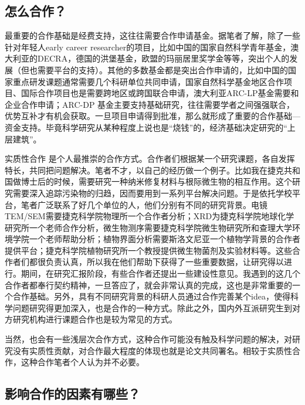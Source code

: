 \documentclass[]{book}
\begin{document}
\hypertarget{ux600eux4e48ux5408ux4f5c}{%
\subsection{怎么合作？}\label{ux600eux4e48ux5408ux4f5c}}

最重要的合作基础是经费支持，这往往需要合作申请基金。据笔者了解，除了一些针对年轻人early career researcher的项目，比如中国的国家自然科学青年基金，澳大利亚的DECRA，德国的洪堡基金，欧盟的玛丽居里奖学金等等，突出个人的发展（但也需要平台的支持）。其他的多数基金都是突出合作申请的，比如中国的国家重点研发课题通常需要几个科研单位共同申请，国家自然科学基金地区合作项目、国际合作项目也是需要跨地区或跨国联合申请，澳大利亚ARC-LP基金需要和企业合作申请；ARC-DP 基金主要支持基础研究，往往需要学者之间强强联合，优势互补才有机会获取。一旦项目申请得到批准，那么就形成了重要的合作基础---资金支持。毕竟科学研究从某种程度上说也是``烧钱''的，经济基础决定研究的``上层建筑''。

实质性合作 是个人最推崇的合作方式。合作者们根据某一个研究课题，各自发挥特长，共同把问题解决。笔者不才，以自己的经历做一个例子。比如我在捷克共和国做博士后的时候，需要研究一种纳米修复材料与根际微生物的相互作用。这个研究需要深入追踪污染物的归趋，因而要用到一系列平台解决问题。于是依托学校平台，笔者广泛联系了好几个单位的人，他们分别有不同的研究背景。电镜TEM/SEM需要捷克科学院物理所一个合作者分析；XRD为捷克科学院地球化学研究所一个老师合作分析，微生物测序需要捷克科学院微生物研究所和查理大学环境学院一个老师帮助分析；植物界面分析需要斯洛文尼亚一个植物学背景的合作者提供平台；捷克科学院植物研究所一个教授提供微生物菌剂及实验材料等。这些合作者们都很负责认真，所以我在他们帮助下获得了一些重要数据，让研究得以进行。期间，在研究汇报阶段，有些合作者还提出一些建设性意见。我遇到的这几个合作者都奉行契约精神，一旦答应了，就会非常认真的完成，这也是非常重要的一个合作基础。另外，具有不同研究背景的科研人员通过合作完善某个idea，使得科学问题研究得更加深入，也是合作的一种方式。除此之外，国内外互派研究生到对方研究机构进行课题合作也是较为常见的方式。

当然，也会有一些浅层次合作方式，这种合作可能没有触及科学问题的解决，对研究没有实质性贡献，对合作最大程度的体现也就是论文共同署名。相较于实质性合作，这种合作笔者个人认为并不必要。

\hypertarget{ux5f71ux54cdux5408ux4f5cux7684ux56e0ux7d20ux6709ux54eaux4e9b}{%
\subsection{影响合作的因素有哪些？}\label{ux5f71ux54cdux5408ux4f5cux7684ux56e0ux7d20ux6709ux54eaux4e9b}}
\end{document}
